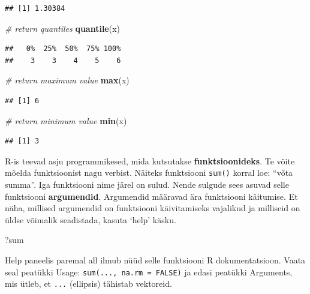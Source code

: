 \documentclass[]{book}
\newenvironment{Shaded}{\begin{snugshade}}{\end{snugshade}}
\newcommand{\KeywordTok}[1]{\textcolor[rgb]{0.13,0.29,0.53}{\textbf{#1}}}
\newcommand{\CommentTok}[1]{\textcolor[rgb]{0.56,0.35,0.01}{\textit{#1}}}
\newcommand{\NormalTok}[1]{#1}
\begin{document}
\begin{verbatim}
## [1] 1.30384
\end{verbatim}

\begin{Shaded}
\begin{Highlighting}[]
\CommentTok{# return quantiles}
\KeywordTok{quantile}\NormalTok{(x)}
\end{Highlighting}
\end{Shaded}

\begin{verbatim}
##   0%  25%  50%  75% 100% 
##    3    3    4    5    6
\end{verbatim}

\begin{Shaded}
\begin{Highlighting}[]
\CommentTok{# return maximum value}
\KeywordTok{max}\NormalTok{(x)}
\end{Highlighting}
\end{Shaded}

\begin{verbatim}
## [1] 6
\end{verbatim}

\begin{Shaded}
\begin{Highlighting}[]
\CommentTok{# return minimum value}
\KeywordTok{min}\NormalTok{(x)}
\end{Highlighting}
\end{Shaded}

\begin{verbatim}
## [1] 3
\end{verbatim}

R-is teevad asju programmikesed, mida kutsutakse
\textbf{funktsioonideks}. Te võite mõelda funktsioonist nagu verbist.
Näiteks funktsiooni \texttt{sum()} korral loe: ``võta summa''. Iga
funktsiooni nime järel on sulud. Nende sulgude sees asuvad selle
funktsiooni \textbf{argumendid}. Argumendid määravad ära funktsiooni
käitumise. Et näha, millised argumendid on funktsiooni käivitamiseks
vajalikud ja milliseid on üldse võimalik seadistada, kasuta `help'
käsku.

\begin{Shaded}
\begin{Highlighting}[]
\NormalTok{?sum}
\end{Highlighting}
\end{Shaded}

Help paneelis paremal all ilmub nüüd selle funktsiooni R
dokumentatsioon. Vaata seal peatükki Usage:
\texttt{sum(...,\ na.rm\ =\ FALSE)} ja edasi peatükki Arguments, mis
ütleb, et \texttt{...} (ellipsis) tähistab vektoreid.
\end{document}
